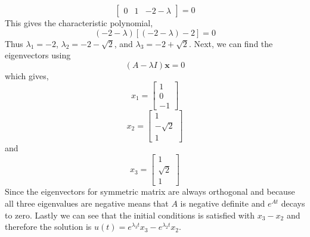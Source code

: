 \begin{enumerate}[label=\arabic*.]
\begin{mdframed}[style=MyFrame]
\begin{equation}
\begin{bmatrix}
                0               &   1           &   -2-\lambda 
            \end{bmatrix}
            =
            0
        \end{equation}
        This gives the characteristic polynomial,
        \begin{equation}
            \left(-2-\lambda\right)\left[\left(-2-\lambda\right)-2\right] =
            0
        \end{equation}
        Thus $\lambda_{1}=-2$, $\lambda_{2}=-2-\sqrt{2}$, and
        $\lambda_{3}=-2+\sqrt{2}$. Next, we can find the eigenvectors using
        \begin{equation}
            \left( A-\lambda I\right) \mathbf{x} = 0
        \end{equation}
        which gives,
        \begin{equation}
            x_{1} = 
            \begin{bmatrix}
                1       \\
                0       \\
                -1
            \end{bmatrix}
        \end{equation}
        \begin{equation}
            x_{2} = 
            \begin{bmatrix}
                1           \\
                -\sqrt{2}   \\
                1
            \end{bmatrix}
        \end{equation}
        and
        \begin{equation}
            x_{3} = 
            \begin{bmatrix}
                1           \\
                \sqrt{2}   \\
                1
            \end{bmatrix}
        \end{equation}
        Since the eigenvectors for symmetric matrix are always orthogonal
        and because all three eigenvalues are negative means that $A$ is
        negative definite and $e^{At}$ decays to zero. Lastly we can see
        that the initial conditions is satisfied with $x_{3}-x_{2}$ and
        therefore the solution is $u(t)=e^{\lambda_{3}t}x_{3} -
        e^{\lambda_{2}t}x_{2}$.

    \end{mdframed}


\end{enumerate}
